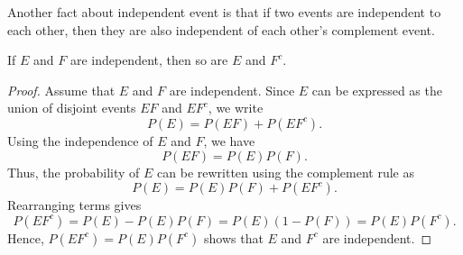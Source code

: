 Another fact about independent event is that if two events are independent to each other, then they are also independent of each other's complement event.
\begin{proposition}
    If \(E\) and \(F\) are independent, then so are \(E\) and \(F^c\).
    \end{proposition}
    \begin{proof}
        Assume that \(E\) and \(F\) are independent. Since \(E\) can be expressed as the union of disjoint events \(EF\) and \(EF^c\), we write
        \[
        P(E) = P(EF) + P(EF^c).
        \]
        Using the independence of \(E\) and \(F\), we have
        \[
        P(EF) = P(E)P(F).
        \]
        Thus, the probability of \(E\) can be rewritten using the complement rule as
        \[
        P(E) = P(E)P(F) + P(EF^c).
        \]
        Rearranging terms gives
        \[
        P(EF^c) = P(E) - P(E)P(F) = P(E)(1 - P(F)) = P(E)P(F^c).
        \]
        Hence, \(P(EF^c) = P(E)P(F^c)\) shows that \(E\) and \(F^c\) are independent.
        \end{proof}
    
